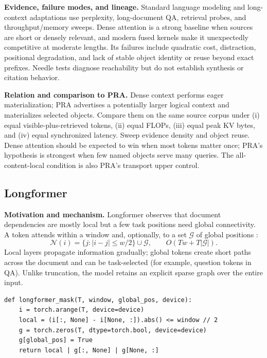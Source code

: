 \textbf{Evidence, failure modes, and lineage.} Standard language modeling and long-context
adaptations use perplexity, long-document QA, retrieval probes, and throughput/memory
sweeps.  Dense attention is a strong baseline when sources are short or densely relevant,
and modern fused kernels make it unexpectedly competitive at moderate lengths.  Its
failures include quadratic cost, distraction, positional degradation, and lack of stable
object identity or reuse beyond exact prefixes.  Needle tests diagnose reachability but do
not establish synthesis or citation behavior.

\textbf{Relation and comparison to PRA.} Dense context performs eager materialization;
PRA advertises a potentially larger logical context and materializes selected objects.
Compare them on the same source corpus under (i) equal visible-plus-retrieved tokens,
(ii) equal FLOPs, (iii) equal peak KV bytes, and (iv) equal synchronized latency.  Sweep
evidence density and object reuse.  Dense attention should be expected to win when most
tokens matter once; PRA's hypothesis is strongest when few named objects serve many
queries.  The all-content-local condition is also PRA's transport upper control.

\subsection{Longformer}

\textbf{Motivation and mechanism.} Longformer observes that document dependencies are
mostly local but a few task positions need global connectivity.  A token attends within a
window and, optionally, to a set $\mathcal G$ of global positions
\citep{beltagy2020longformer}:
\begin{equation}
\mathcal N(i)=\{j:|i-j|\leq w/2\}\cup\mathcal G,
\qquad O(Tw+T|\mathcal G|).
\end{equation}
Local layers propagate information gradually; global tokens create short paths across the
document and can be task-selected (for example, question tokens in QA).  Unlike truncation,
the model retains an explicit sparse graph over the entire input.

\begin{lstlisting}[caption={Educational Longformer mask; production kernels avoid materializing $T^2$}]
def longformer_mask(T, window, global_pos, device):
    i = torch.arange(T, device=device)
    local = (i[:, None] - i[None, :]).abs() <= window // 2
    g = torch.zeros(T, dtype=torch.bool, device=device)
    g[global_pos] = True
    return local | g[:, None] | g[None, :]
\end{lstlisting}


